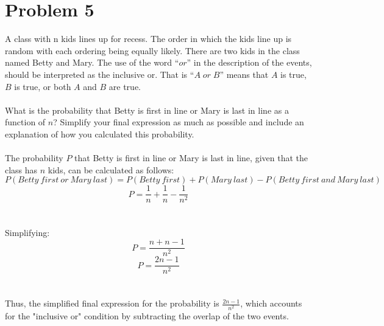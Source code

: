 \documentclass{amsart}
\theoremstyle{definition}
\theoremstyle{Exercise}
\theoremstyle{remark}
\theoremstyle{rule}
\numberwithin{equation}{section}
\begin{document}
  \section*{Problem 5}
  A class with n kids lines up for recess. The order in which the kids line up is random with each ordering being equally likely. There are two kids in the class named Betty and Mary. The use of the word ``$or$'' in the description of the events, should be interpreted as the inclusive or. That is ``$A \;or\; B$'' means that $A$ is true, $B$ is true, or both $A$ and $B$ are true.\\\\
  What is the probability that Betty is first in line or Mary is last in line as a function of $n$? Simplify your final expression as much as possible and include an explanation of how you calculated this probability.
\\\\
The probability \( P \) that Betty is first in line or Mary is last in line, given that the class has \( n \) kids, can be calculated as follows:
\[ P(Betty\ first\ or\ Mary\ last) = P(Betty\ first) + P(Mary\ last) - P(Betty\ first\ and\ Mary\ last) \]
\[ P = \frac{1}{n} + \frac{1}{n} - \frac{1}{n^2} \]\\\\
Simplifying:
\[ P = \frac{n + n - 1}{n^2} \]
\[ P = \frac{2n - 1}{n^2} \]\\\\
Thus, the simplified final expression for the probability is \( \frac{2n - 1}{n^2} \), which accounts for the "inclusive or" condition by subtracting the overlap of the two events.
\\\\
  \newpage
  \section*{}
  \section*{}
\end{document}

